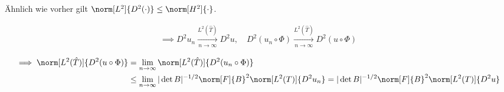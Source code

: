 \begin{solution}
Ähnlich wie vorher gilt $\norm[L^2]{D^2 (\cdot)} \leq \norm[H^2]{\cdot}$.

\begin{align*}
  \implies
  D^2 u_n \xrightarrow[n \to \infty]{L^2(\hat T)} D^2 u,
  \quad
  D^2 (u_n \circ \Phi) \xrightarrow[n \to \infty]{L^2(\hat T)} D^2 (u \circ \Phi)
\end{align*}


\begin{align*}
  \implies
  \norm[L^2(\hat T)]{D^2(u\circ\Phi)}
  &=
  \lim_{n \to \infty}
  \norm[L^2(\hat T)]{D^2(u_n\circ\Phi)} \\
  &\leq
  \lim_{n \to \infty}
  |\det B|^{-1/2}
  \norm[F]{B}^2
  \norm[L^2(T)]{D^2 u_n}
  =
  |\det B|^{-1/2}
  \norm[F]{B}^2
  \norm[L^2(T)]{D^2 u}
\end{align*}

\end{solution}

